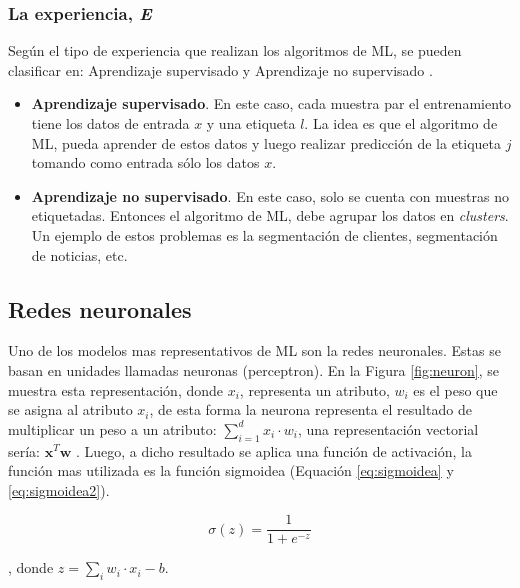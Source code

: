 \subsubsection{La experiencia, \textit{E}}

Según el tipo de experiencia que realizan los algoritmos de ML, se pueden clasificar en: Aprendizaje supervisado y Aprendizaje no supervisado \cite{Goodfellow2016}.

\begin{itemize}
	\item \textbf{Aprendizaje supervisado}. En este caso, cada muestra par el entrenamiento tiene los datos de entrada $x$ y una etiqueta $l$. La idea es que el algoritmo de ML, pueda aprender de estos datos y luego realizar predicción de la etiqueta $j$ tomando como entrada sólo los datos $x$.
	
	\item \textbf{Aprendizaje no supervisado}. En este caso, solo se cuenta con muestras no etiquetadas. Entonces el algoritmo   de ML, debe agrupar los datos en \textit{clusters}. Un ejemplo de estos problemas es la segmentación de clientes, segmentación de noticias, etc.
\end{itemize}





\subsection{Redes neuronales}

Uno  de los modelos mas representativos de ML son la redes neuronales. Estas se basan en unidades llamadas neuronas (perceptron). En la Figura \ref{fig:neuron}, se muestra esta representación, donde $x_i$, representa un atributo, $w_i$ es el peso que se asigna al atributo $x_i$, de esta forma la neurona representa el resultado de multiplicar un peso a un atributo: $\sum_{i=1}^{d} x_i \cdot w_i$, una representación vectorial sería: $\textbf{x}^T\textbf{w}$ \citep{nielsen2015neural}. Luego, a dicho resultado se aplica una función de activación, la función mas utilizada es la función sigmoidea (Equación \ref{eq:sigmoidea} y \ref{eq:sigmoidea2}).  

\begin{equation}\label{eq:sigmoidea}
	\sigma (z) = \frac{1}{1 + e^{-z}}
\end{equation}

, donde $z = \sum_{i}^{} w_i \cdot x_i - b$.

